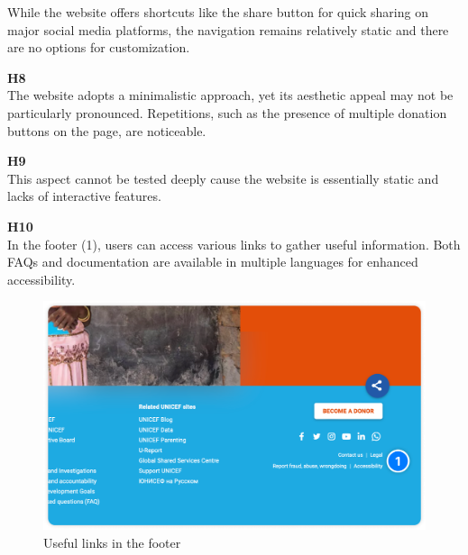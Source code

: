 \begin{description}
    While the website offers shortcuts like the share button for quick sharing on major social media platforms, the navigation remains relatively static and there are no options for customization.
    \item {\textbf{H8} \color{unicefGray}{Aesthetic and minimalist design}}\\
    The website adopts a minimalistic approach, yet its aesthetic appeal may not be particularly pronounced. 
    Repetitions, such as the presence of multiple donation buttons on the page, are noticeable.
    \newpage
    \item {\textbf{H9} \color{unicefGray}{Help users recognize, diagnose and recover from errors}}\\
    This aspect cannot be tested deeply cause the website is essentially static and lacks of interactive features.
    \item {\textbf{H10} \color{unicefGray}{Help and documentation}}\\
    In the footer (1), users can access various links to gather useful information. 
    Both FAQs and documentation are available in multiple languages for enhanced accessibility.
    \begin{figure}[h]
        \centering
        \includegraphics[scale=0.20]{Resources/Dario/footer}
        \caption{Useful links in the footer}
    \end{figure}
\end{description}
\newpage
